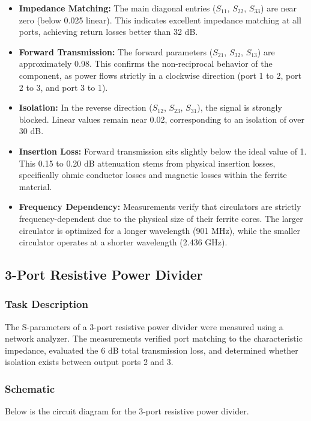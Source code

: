 \begin{itemize}
    \item \textbf{Impedance Matching:} The main diagonal entries ($S_{11}$, $S_{22}$, $S_{33}$) are near zero (below 0.025 linear). This indicates excellent impedance matching at all ports, achieving return losses better than 32 dB.
    
    \item \textbf{Forward Transmission:} The forward parameters ($S_{21}$, $S_{32}$, $S_{13}$) are approximately 0.98. This confirms the non-reciprocal behavior of the component, as power flows strictly in a clockwise direction (port 1 to 2, port 2 to 3, and port 3 to 1).
    
    \item \textbf{Isolation:} In the reverse direction ($S_{12}$, $S_{23}$, $S_{31}$), the signal is strongly blocked. Linear values remain near 0.02, corresponding to an isolation of over 30 dB.
    
    \item \textbf{Insertion Loss:} Forward transmission sits slightly below the ideal value of 1. This 0.15 to 0.20 dB attenuation stems from physical insertion losses, specifically ohmic conductor losses and magnetic losses within the ferrite material.
    
    \item \textbf{Frequency Dependency:} Measurements verify that circulators are strictly frequency-dependent due to the physical size of their ferrite cores. The larger circulator is optimized for a longer wavelength (901 MHz), while the smaller circulator operates at a shorter wavelength (2.436 GHz).
\end{itemize}

\subsection{3-Port Resistive Power Divider}

\subsubsection{Task Description}
The S-parameters of a 3-port resistive power divider were measured using a network analyzer. The measurements verified port matching to the characteristic impedance, evaluated the 6 dB total transmission loss, and determined whether isolation exists between output ports 2 and 3.

\subsubsection{Schematic}
Below is the circuit diagram for the 3-port resistive power divider.

